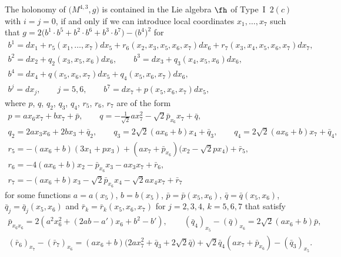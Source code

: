 \begin{Proposition} \label{P36} The holonomy of $\big(M^{4,3},g\big)$ is contained in the Lie algebra $\fh$ of Type~I~$2(c)$ with $i=j=0$, if and only if we can introduce local coordinates $x_1,\dots,x_7$ such that $g=2\big(b^1\cdot b^5+b^2\cdot b^6+b^3\cdot b^7\big)- \big(b^4\big)^2$ for
\begin{gather*}
b^1= dx_1 + r_5(x_1,\dots, x_7)dx_5+r_6(x_2,x_3,x_5,x_6,x_7)dx_6+r_7(x_3,x_4,x_5,x_6,x_7)dx_7, \\
b^2= dx_2+q_2(x_3,x_5,x_6)dx_6, \qquad b^3= dx_3+q_3(x_4,x_5,x_6) dx_6, \\
b^4= dx_4+ q(x_5,x_6,x_7)dx_5+q_4(x_5,x_6,x_7)dx_6, \\
b^j= dx_j,\qquad j=5,6, \qquad
b^7= dx_7 +p(x_5,x_6,x_7)dx_5,
\end{gather*}
where $p$, $q$, $q_2$, $q_3$, $q_4$, $r_5$, $r_6$, $r_7$ are of the form
\begin{gather*}
p = ax_6x_7+bx_7+\bar p,\qquad
q = -\tfrac1{\sqrt 2} ax_7^2 -\sqrt 2 \bar p_{x_6}x_7+\bar q, \\
q_2 = 2ax_3x_6 +2bx_3+\bar q_2,\qquad
q_3= 2\sqrt 2 (ax_6+b) x_4+\bar q_3, \qquad
q_4 = 2\sqrt 2 (ax_6+b) x_7+\bar q_4, \\
r_5=-(ax_6+b)(3x_1+px_3)+(ax_7+\bar p_{x_6})\big(x_2-\sqrt2 px_4\big)+\bar r_5, \\
r_6=-4(ax_6+b)x_2-\bar p_{x_6}x_3-ax_3x_7+\bar r_6, \\
r_7=-(ax_6+b)x_3-\sqrt2 \bar p_{x_6}x_4-\sqrt2 ax_4 x_7+\bar r_7
\end{gather*}
for some functions $a=a(x_5)$, $b=b(x_5)$, $\bar p=\bar p(x_5,x_6)$, $\bar q=\bar q(x_5,x_6)$, $\bar q_j=\bar q_j(x_5,x_6)$ and $\bar r_k=\bar r_k(x_5,x_6,x_7)$ for $j=2,3,4$, $k=5,6,7$ that satisfy
\begin{gather*}
\bar p_{x_6 x_6}=2(a^2x_6^2+(2ab-a')x_6+b^2-b'), \qquad
(\bar q_4)_{x_5}-(\bar q)_{x_6}=2\sqrt 2(ax_6+b)\bar p,\\
(\bar r_6)_{x_7}-(\bar r_7)_{x_6}=(ax_6+b)\big(2ax_7^2+\bar q_3+2\sqrt2 \bar q\big)+\sqrt2 \bar q_4(ax_7+\bar p_{x_6} )-(\bar q_3)_{x_5}.
\end{gather*}
\end{Proposition}

